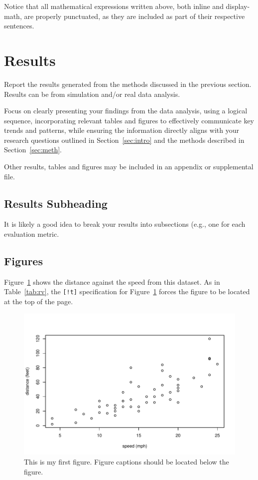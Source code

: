 \documentclass[12pt]{article}
\begin{document}
Notice that all mathematical expressions written above, both inline and 
display-math, are properly punctuated, as they are included as part of their
respective sentences.  
 

\section{Results}
\label{sec:resu}

Report the results generated from the methods discussed in the previous section.  
Results can be from simulation and/or real data analysis. 


Focus on clearly presenting your findings from the data analysis, using a 
logical sequence, incorporating relevant tables and figures to effectively 
communicate key trends and patterns, while ensuring the information directly 
aligns with your research questions outlined in Section~\ref{sec:intro} and the 
methods described in Section~\ref{sec:meth}.


Other results, tables and figures may be included in an appendix or supplemental
file.  


\subsection{Results Subheading}

It is likely a good idea to break your results into subsections (e.g., one 
for each evaluation metric. 


\subsection{Figures} 

Figure~\ref{fig:cars} shows the distance against the speed from this dataset.
As in Table~\ref{tab:rv}, the \verb|[!t]| specification for 
Figure~\ref{fig:cars} forces the figure to be located at the top of the page.     


\begin{figure}[!t]
  \centering
  \includegraphics[width=\textwidth]{cars.pdf}
  \caption{This is my first figure. Figure captions should be located below
	the figure.}
  \label{fig:cars}
\end{figure}
\end{document}
